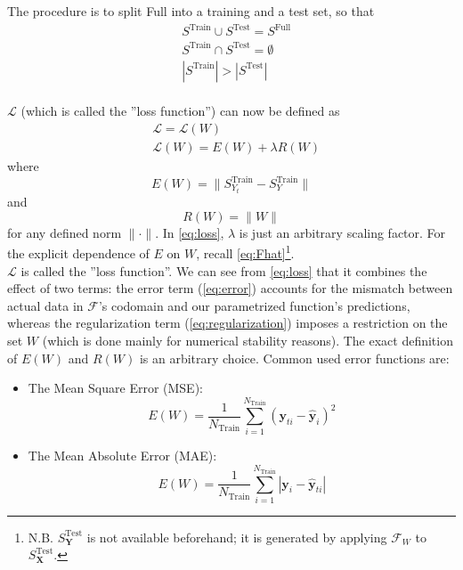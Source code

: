 The procedure is to split Full into a training and a test set, so that
\begin{align}
	& S^\text{Train} \cup S^\text{Test} = S^\text{Full} \\
	& S^\text{Train} \cap S^\text{Test} = \emptyset \\
	& |S^\text{Train}| > |S^\text{Test}|
\end{align}\\
%
$\mathcal{L}$ (which is called the ''loss function'') can now be defined as
\begin{align}
	& \mathcal{L}=\mathcal{L}(W) \\
	& \mathcal{L}(W)=E(W)+\lambda R(W) \label{eq:loss}
\end{align}
where
\begin{equation}\label{eq:error}
	E(W) = \|S^\text{Train}_{Y_t} - S^\text{Train}_Y\|
\end{equation}
and
\begin{equation}\label{eq:regularization}
	R(W) = \|W\|
\end{equation}
for any defined norm $\|\cdot\|$. In \cref{eq:loss}, $\lambda$ is just an arbitrary scaling factor. For the explicit dependence of $E$ on $W$, recall \cref{eq:Fhat}\footnote{N.B. $S^\text{Test}_{\mathbf{{Y}}}$ is not available beforehand; it is generated by applying $\mathcal{{F}}_W$ to $S^\text{Test}_{\mathbf{X}}$.}.\\
%
\indent $\mathcal{L}$ is called the ''loss function''. We can see from \cref{eq:loss} that it combines the effect of two terms: the error term (\cref{eq:error}) accounts for the mismatch between actual data in $\mathcal{F}$'s codomain and our parametrized function's predictions, whereas the regularization term (\cref{eq:regularization}) imposes a restriction on the set $W$ (which is done mainly for numerical stability reasons). The exact definition of $E(W)$ and $R(W)$ is an arbitrary choice. Common used error functions are:
\begin{itemize}
	\item The Mean Square Error (MSE):
	\begin{equation}\label{eq:mse}
		E(W) = \frac{1}{N_{\text{Train}}} \sum_{i=1}^{N_{\text{Train}}} (\mathbf{y}_{ti} - \mathbf{\hat{y}}_i)^2
	\end{equation}
	\item The Mean Absolute Error (MAE):
	\begin{equation}\label{eq:mae}
		E(W) = \frac{1}{N_{\text{Train}}} \sum_{i=1}^{N_{\text{Train}}} \left|\mathbf{y}_i - \mathbf{\hat{y}}_{ti}\right|
	\end{equation}
\end{itemize}

